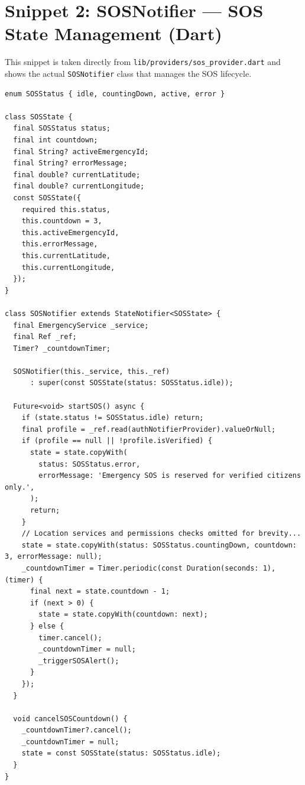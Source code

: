 \documentclass[11pt, a4paper]{report}
\begin{document}
\section*{Snippet 2: SOSNotifier --- SOS State Management (Dart)}
This snippet is taken directly from \texttt{lib/providers/sos\_provider.dart} and shows the actual \texttt{SOSNotifier} class that manages the SOS lifecycle.
\begin{verbatim}
enum SOSStatus { idle, countingDown, active, error }

class SOSState {
  final SOSStatus status;
  final int countdown;
  final String? activeEmergencyId;
  final String? errorMessage;
  final double? currentLatitude;
  final double? currentLongitude;
  const SOSState({
    required this.status,
    this.countdown = 3,
    this.activeEmergencyId,
    this.errorMessage,
    this.currentLatitude,
    this.currentLongitude,
  });
}

class SOSNotifier extends StateNotifier<SOSState> {
  final EmergencyService _service;
  final Ref _ref;
  Timer? _countdownTimer;

  SOSNotifier(this._service, this._ref)
      : super(const SOSState(status: SOSStatus.idle));

  Future<void> startSOS() async {
    if (state.status != SOSStatus.idle) return;
    final profile = _ref.read(authNotifierProvider).valueOrNull;
    if (profile == null || !profile.isVerified) {
      state = state.copyWith(
        status: SOSStatus.error,
        errorMessage: 'Emergency SOS is reserved for verified citizens only.',
      );
      return;
    }
    // Location services and permissions checks omitted for brevity...
    state = state.copyWith(status: SOSStatus.countingDown, countdown: 3, errorMessage: null);
    _countdownTimer = Timer.periodic(const Duration(seconds: 1), (timer) {
      final next = state.countdown - 1;
      if (next > 0) {
        state = state.copyWith(countdown: next);
      } else {
        timer.cancel();
        _countdownTimer = null;
        _triggerSOSAlert();
      }
    });
  }

  void cancelSOSCountdown() {
    _countdownTimer?.cancel();
    _countdownTimer = null;
    state = const SOSState(status: SOSStatus.idle);
  }
}
\end{verbatim}

\vspace{1cm}
\end{document}
